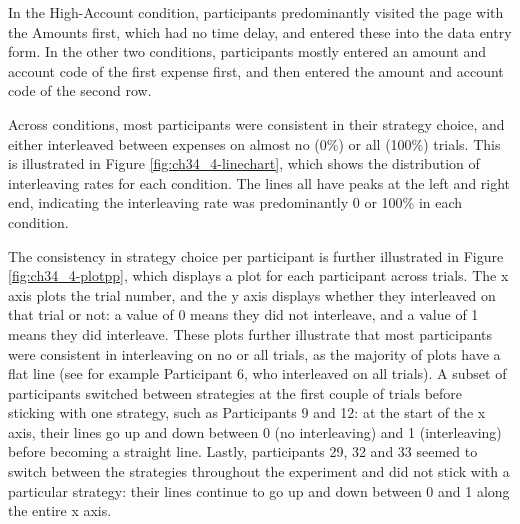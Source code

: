 In the High-Account condition, participants predominantly visited the page with the Amounts first, which had no time delay, and entered these into the data entry form. In the other two conditions, participants mostly entered an amount and account code of the first expense first, and then entered the amount and account code of the second row. 

Across conditions, most participants were consistent in their strategy choice, and either interleaved between expenses on almost no (0\%) or all (100\%) trials. This is illustrated in Figure \ref{fig:ch34_4-linechart}, which shows the distribution of interleaving rates for each condition. The lines all have peaks at the left and right end, indicating the interleaving rate was predominantly 0 or 100\% in each condition.

The consistency in strategy choice per participant is further illustrated in Figure \ref{fig:ch34_4-plotpp}, which displays a plot for each participant across trials. The x axis plots the trial number, and the y axis displays whether they interleaved on that trial or not: a value of 0 means they did not interleave, and a value of 1 means they did interleave. These plots further illustrate that most participants were consistent in interleaving on no or all trials, as the majority of plots have a flat line (see for example Participant 6, who interleaved on all trials). A subset of participants switched between strategies at the first couple of trials before sticking with one strategy, such as Participants 9 and 12: at the start of the x axis, their lines go up and down between 0 (no interleaving) and 1 (interleaving) before becoming a straight line. Lastly, participants 29, 32 and 33 seemed to switch between the strategies throughout the experiment and did not stick with a particular strategy: their lines continue to go up and down between 0 and 1 along the entire x axis. 

